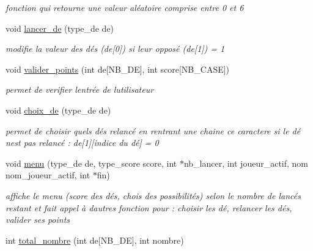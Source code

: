 \begin{DoxyCompactItemize}
\begin{DoxyCompactList}\small\item\em fonction qui retourne une valeur aléatoire comprise entre 0 et 6 \end{DoxyCompactList}\item 
void \mbox{\hyperlink{yams___cleo___martin-_colleu__2_80_8c_a8da1d298788f0d42c2755d2aef014b6f}{lancer\+\_\+de}} (type\+\_\+de de)
\begin{DoxyCompactList}\small\item\em modifie la valeur des dés (de\mbox{[}0\mbox{]}) si leur opposé (de\mbox{[}1\mbox{]}) = 1 \end{DoxyCompactList}\item 
void \mbox{\hyperlink{yams___cleo___martin-_colleu__2_80_8c_ae2a93c2991c556e62762ba0d81d483f0}{valider\+\_\+points}} (int de\mbox{[}N\+B\+\_\+\+DE\mbox{]}, int score\mbox{[}N\+B\+\_\+\+C\+A\+SE\mbox{]})
\begin{DoxyCompactList}\small\item\em permet de verifier l\textquotesingle{}entrée de l\textquotesingle{}utilisateur \end{DoxyCompactList}\item 
void \mbox{\hyperlink{yams___cleo___martin-_colleu__2_80_8c_acdf5442484ebac64baffd975bb117bf8}{choix\+\_\+de}} (type\+\_\+de de)
\begin{DoxyCompactList}\small\item\em permet de choisir quels dés relancé en rentrant une chaine ce caractere si le dé n\textquotesingle{}est pas relancé \+: de\mbox{[}1\mbox{]}\mbox{[}indice du dé\mbox{]} = 0 \end{DoxyCompactList}\item 
void \mbox{\hyperlink{yams___cleo___martin-_colleu__2_80_8c_a546ce9e2b826a940aa39b86be0ed9a54}{menu}} (type\+\_\+de de, type\+\_\+score score, int $\ast$nb\+\_\+lancer, int joueur\+\_\+actif, nom nom\+\_\+joueur\+\_\+actif, int $\ast$fin)
\begin{DoxyCompactList}\small\item\em affiche le menu (score des dés, chois des possibilités) selon le nombre de lancés restant et fait appel à d\textquotesingle{}autres fonction pour \+: choisir les dé, relancer les dés, valider ses points \end{DoxyCompactList}\item 
int \mbox{\hyperlink{yams___cleo___martin-_colleu__2_80_8c_a438a5164d4aac732138ced5899be0379}{total\+\_\+nombre}} (int de\mbox{[}N\+B\+\_\+\+DE\mbox{]}, int nombre)

\end{DoxyCompactItemize}
